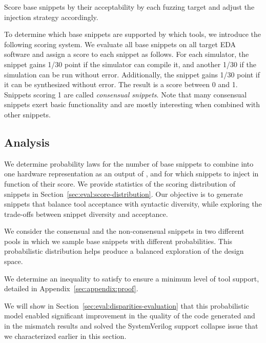 \begin{newdesignprinciple}
    Score base snippets by their acceptability by each fuzzing target and adjust the injection strategy accordingly.
\end{newdesignprinciple}

To determine which base snippets are supported by which tools, we introduce the following scoring system.
We evaluate all base snippets on all target EDA software and assign a score to each snippet as follows.
For each simulator, the snippet gains 1/30 point if the simulator can compile it, and another 1/30 if the simulation can be run without error.
Additionally, the snippet gains 1/30 point if it can be synthesized without error.
The result is a score between 0 and 1.
Snippets scoring 1 are called \emph{consensual snippets}.
Note that many consensual snippets exert basic functionality and are mostly interesting when combined with other snippets.

\subsection{Analysis}
\label{sec:disparities:analysis}

We determine probability laws for the number of base snippets to combine into one hardware representation as an output of \ourname,
and for which snippets to inject in function of their score.
% 
We provide statistics of the scoring distribution of snippets in Section~\ref{sec:eval:score-distribution}.
%
Our objective is to generate snippets that balance tool acceptance with syntactic diversity, while exploring the trade-offs between snippet diversity and acceptance.

We consider the consensual and the non-consensual snippets in two different pools in which we sample base snippets with different probabilities.
This probabilistic distribution helps produce a balanced exploration of the design space.

We determine an inequality to satisfy to ensure a minimum level of tool support, detailed in Appendix~\ref{sec:appendix:proof}.

We will show in Section~\ref{sec:eval:disparities-evaluation} that this probabilistic model enabled significant improvement in the quality
of the code generated and in the mismatch results and solved the SystemVerilog support collapse issue that we characterized earlier in this section.
